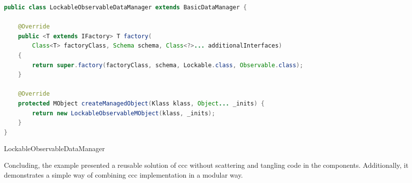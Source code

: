 \begin{sourcecode} [H]
	\begin{lstlisting}[language=Java, escapechar=|]
public class LockableObservableDataManager extends BasicDataManager {

	@Override
	public <T extends IFactory> T factory(
		Class<T> factoryClass, Schema schema, Class<?>... additionalInterfaces) 
	{
		return super.factory(factoryClass, schema, Lockable.class, Observable.class);
	}

	@Override
	protected MObject createManagedObject(Klass klass, Object... _inits) {
		return new LockableObservableMObject(klass, _inits);
	}
}
	\end{lstlisting}
	\caption{LockableObservableDataManager}
	\label{lst:LockableObservableDataManager}
\end{sourcecode}

Concluding, the example presented a reusable solution of \ac{ccc} without scattering and tangling code in the components.
Additionally, it demonstrates a simple way of combining \ac{ccc} implementation in a modular way.